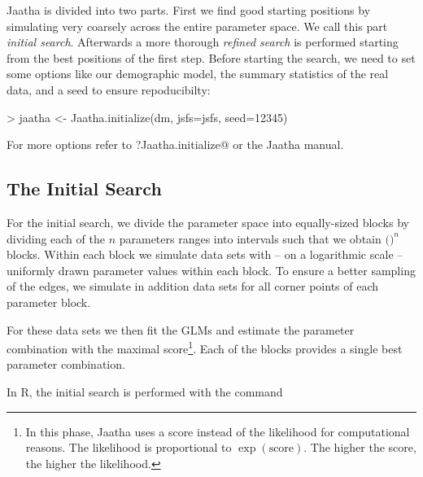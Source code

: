 \documentclass[a4paper]{article}
\begin{document}
\noindent
Jaatha is divided into two parts. First we find good starting
positions by simulating very coarsely across the entire parameter space. We call
this part \emph{initial search}. Afterwards a more thorough \emph{refined search}
is performed starting from the best positions of the first step. Before starting
the search, we need to set some options like our demographic model, the summary 
statistics of the real data, and a seed to ensure repoducibilty:

\begin{Schunk}
\begin{Sinput}
> jaatha <- Jaatha.initialize(dm, jsfs=jsfs, seed=12345)
\end{Sinput}
\end{Schunk}


\noindent
For more options refer to \verb@?Jaatha.initialize@ or the Jaatha manual.

\subsection{The Initial Search}

\noindent
For the initial search, we divide the parameter space into equally-sized blocks by dividing 
each of the $n$ parameters ranges into \verb@nBlocksPerPar@ intervals such that we obtain 
$($\verb@nBlocksPerPar@$)^n$ blocks. Within each block we simulate \verb@nSim@ data sets with 
-- on a logarithmic scale -- uniformly drawn parameter values within each block. To ensure 
a better sampling of the edges, we simulate in addition data sets for all corner points of 
each parameter block.

For these data sets we then fit the GLMs and estimate the parameter combination with the
maximal score\footnote{In this phase, Jaatha uses a score instead of the
likelihood for computational reasons. The likelihood is proportional to $\exp(\text{score})$. 
The higher the score, the higher the likelihood.}. 
Each of the blocks provides a single best parameter combination.

In R, the initial search is performed with the command


\end{document}
